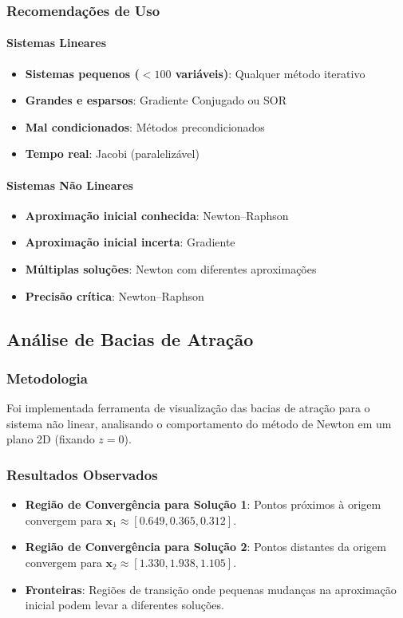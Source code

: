 \documentclass[12pt,a4paper]{article}
\begin{document}
\subsubsection{Recomendações de Uso}
\paragraph{Sistemas Lineares}
\begin{itemize}
    \item \textbf{Sistemas pequenos ($<100$ variáveis)}: Qualquer método iterativo
    \item \textbf{Grandes e esparsos}: Gradiente Conjugado ou SOR
    \item \textbf{Mal condicionados}: Métodos precondicionados
    \item \textbf{Tempo real}: Jacobi (paralelizável)
\end{itemize}

\paragraph{Sistemas Não Lineares}
\begin{itemize}
    \item \textbf{Aproximação inicial conhecida}: Newton--Raphson
    \item \textbf{Aproximação inicial incerta}: Gradiente
    \item \textbf{Múltiplas soluções}: Newton com diferentes aproximações
    \item \textbf{Precisão crítica}: Newton--Raphson
\end{itemize}

\subsection{Análise de Bacias de Atração}

\subsubsection{Metodologia}
Foi implementada ferramenta de visualização das bacias de atração para o sistema não linear, analisando o comportamento do método de Newton em um plano 2D (fixando $z=0$).

\subsubsection{Resultados Observados}
\begin{itemize}
    \item \textbf{Região de Convergência para Solução 1}: Pontos próximos à origem convergem para $\mathbf{x}_1 \approx [0.649,0.365,0.312]$.
    \item \textbf{Região de Convergência para Solução 2}: Pontos distantes da origem convergem para $\mathbf{x}_2 \approx [1.330,1.938,1.105]$.
    \item \textbf{Fronteiras}: Regiões de transição onde pequenas mudanças na aproximação inicial podem levar a diferentes soluções.
\end{itemize}
\end{document}
